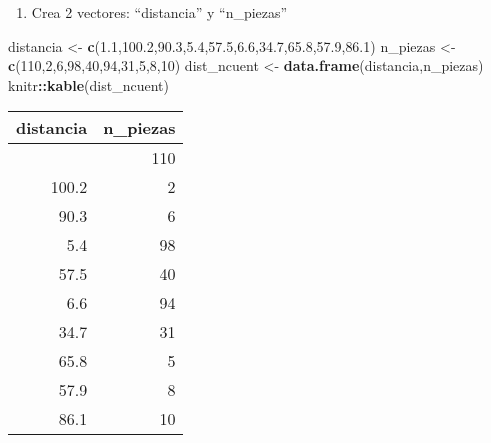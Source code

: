 \documentclass[
]{article}
\newenvironment{Shaded}{\begin{snugshade}}{\end{snugshade}}
\newcommand{\DecValTok}[1]{\textcolor[rgb]{0.00,0.00,0.81}{#1}}
\newcommand{\FloatTok}[1]{\textcolor[rgb]{0.00,0.00,0.81}{#1}}
\newcommand{\FunctionTok}[1]{\textcolor[rgb]{0.13,0.29,0.53}{\textbf{#1}}}
\newcommand{\NormalTok}[1]{#1}
\newcommand{\OtherTok}[1]{\textcolor[rgb]{0.56,0.35,0.01}{#1}}
\newcommand{\SpecialCharTok}[1]{\textcolor[rgb]{0.81,0.36,0.00}{\textbf{#1}}}
\providecommand{\tightlist}{%
  \setlength{\itemsep}{0pt}\setlength{\parskip}{0pt}}
\begin{document}
\begin{enumerate}
\def\labelenumi{\alph{enumi}.}
\tightlist
\item
  Crea 2 vectores: ``distancia'' y ``n\_piezas''
\end{enumerate}

\begin{Shaded}
\begin{Highlighting}[]
\NormalTok{distancia }\OtherTok{\textless{}{-}} \FunctionTok{c}\NormalTok{(}\FloatTok{1.1}\NormalTok{,}\FloatTok{100.2}\NormalTok{,}\FloatTok{90.3}\NormalTok{,}\FloatTok{5.4}\NormalTok{,}\FloatTok{57.5}\NormalTok{,}\FloatTok{6.6}\NormalTok{,}\FloatTok{34.7}\NormalTok{,}\FloatTok{65.8}\NormalTok{,}\FloatTok{57.9}\NormalTok{,}\FloatTok{86.1}\NormalTok{)}
\NormalTok{n\_piezas }\OtherTok{\textless{}{-}} \FunctionTok{c}\NormalTok{(}\DecValTok{110}\NormalTok{,}\DecValTok{2}\NormalTok{,}\DecValTok{6}\NormalTok{,}\DecValTok{98}\NormalTok{,}\DecValTok{40}\NormalTok{,}\DecValTok{94}\NormalTok{,}\DecValTok{31}\NormalTok{,}\DecValTok{5}\NormalTok{,}\DecValTok{8}\NormalTok{,}\DecValTok{10}\NormalTok{)}
\NormalTok{dist\_ncuent }\OtherTok{\textless{}{-}} \FunctionTok{data.frame}\NormalTok{(distancia,n\_piezas)}
\NormalTok{knitr}\SpecialCharTok{::}\FunctionTok{kable}\NormalTok{(dist\_ncuent)}
\end{Highlighting}
\end{Shaded}

\begin{longtable}[]{@{}rr@{}}
\toprule\noalign{}
distancia & n\_piezas \\
\midrule\noalign{}
\endhead
\bottomrule\noalign{}
\endlastfoot
1.1 & 110 \\
100.2 & 2 \\
90.3 & 6 \\
5.4 & 98 \\
57.5 & 40 \\
6.6 & 94 \\
34.7 & 31 \\
65.8 & 5 \\
57.9 & 8 \\
86.1 & 10 \\
\end{longtable}
\end{document}
